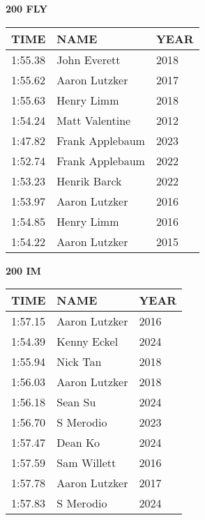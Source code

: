 \begin{minipage}[t]{0.48\textwidth}
\centering
\textbf{200 FLY}\\[0.05cm]
\begin{tabular}{@{}p{1.8cm}p{2.8cm}p{1.2cm}@{}}
\hline
\textbf{TIME} & \textbf{NAME} & \textbf{YEAR} \\
\hline
1:55.38 & John Everett & 2018 \\
1:55.62 & Aaron Lutzker & 2017 \\
1:55.63 & Henry Limm & 2018 \\
1:54.24 & Matt Valentine & 2012 \\
1:47.82 & Frank Applebaum & 2023 \\
1:52.74 & Frank Applebaum & 2022 \\
1:53.23 & Henrik Barck & 2022 \\
1:53.97 & Aaron Lutzker & 2016 \\
1:54.85 & Henry Limm & 2016 \\
1:54.22 & Aaron Lutzker & 2015 \\
\hline
\end{tabular}
\end{minipage}\hfill
\begin{minipage}[t]{0.48\textwidth}
\centering
\textbf{200 IM}\\[0.05cm]
\begin{tabular}{@{}p{1.8cm}p{2.8cm}p{1.2cm}@{}}
\hline
\textbf{TIME} & \textbf{NAME} & \textbf{YEAR} \\
\hline
1:57.15 & Aaron Lutzker & 2016 \\
1:54.39 & Kenny Eckel & 2024 \\
1:55.94 & Nick Tan & 2018 \\
1:56.03 & Aaron Lutzker & 2018 \\
1:56.18 & Sean Su & 2024 \\
1:56.70 & S Merodio & 2023 \\
1:57.47 & Dean Ko & 2024 \\
1:57.59 & Sam Willett & 2016 \\
1:57.78 & Aaron Lutzker & 2017 \\
1:57.83 & S Merodio & 2024 \\
\hline
\end{tabular}
\end{minipage}

\vspace{0.4cm}

